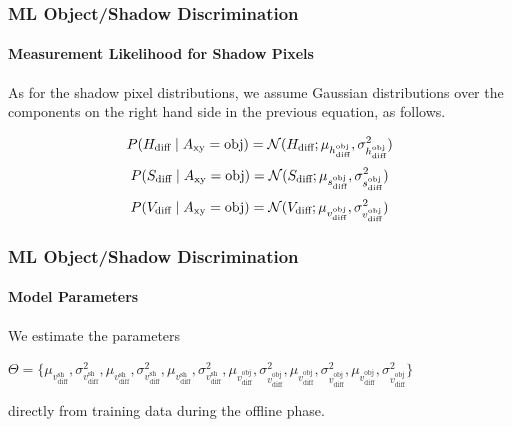 
\begin{frame}
    \frametitle{ML Object/Shadow Discrimination}
    \framesubtitle{Measurement Likelihood for Shadow Pixels}
  
    As for the shadow pixel distributions, we assume Gaussian distributions 
    over the components
    on the right hand side in the previous equation, as follows.

    \begin{equation*}
        P(H_{\text{diff}} \mid A_{\text{xy}} = \text{obj}) =
        {\cal N}(H_{\text{diff}} ;
        \mu_{h_{\text{diff}}^{\text{obj}}},
        \sigma^2_{h_{\text{diff}}^{\text{obj}}})
    \end{equation*}
    \begin{equation*}
        P(S_{\text{diff}} \mid A_{\text{xy}} = \text{obj}) =
        {\cal N}(S_{\text{diff}} ;
        \mu_{s_{\text{diff}}^{\text{obj}}},
        \sigma^2_{s_{\text{diff}}^{\text{obj}}})
    \end{equation*}
    \begin{equation*}
        P(V_{\text{diff}} \mid A_{\text{xy}} = \text{obj}) =
        {\cal N}(V_{\text{diff}} ;
        \mu_{v_{\text{diff}}^{\text{obj}}},
        \sigma^2_{v_{\text{diff}}^{\text{obj}}})
    \end{equation*}

\end{frame}

\fi


\begin{frame}
    \frametitle{ML Object/Shadow Discrimination}
    \framesubtitle{Model Parameters}

    We estimate the parameters \\

    \medskip
  
    $\Theta = \{
    \mu_{v_{\text{diff}}^{\text{sh}}},
    \sigma^2_{v_{\text{diff}}^{\text{sh}}},
    \mu_{v_{\text{diff}}^{\text{sh}}},
    \sigma^2_{v_{\text{diff}}^{\text{sh}}},
    \mu_{v_{\text{diff}}^{\text{sh}}},
    \sigma^2_{v_{\text{diff}}^{\text{sh}}},
    \mu_{v_{\text{diff}}^{\text{obj}}},
    \sigma^2_{v_{\text{diff}}^{\text{obj}}},
    \mu_{v_{\text{diff}}^{\text{obj}}},
    \sigma^2_{v_{\text{diff}}^{\text{obj}}},
    \mu_{v_{\text{diff}}^{\text{obj}}},
    \sigma^2_{v_{\text{diff}}^{\text{obj}}} \}$ \\

    \medskip
  
    directly from training data during the offline phase.

\end{frame}

